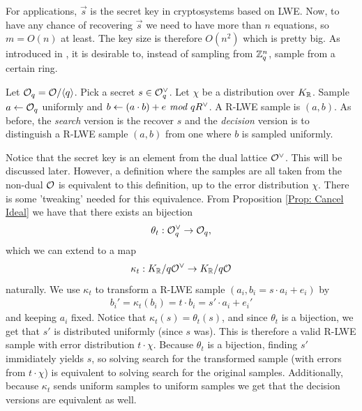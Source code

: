     For applications, \(\vec{s}\) is the secret key in cryptosystems based on LWE. Now, to have any chance of recovering \(\vec{s}\) we need to have more than \(n\) equations, so \(m = O(n)\) at least. The key size is therefore \(O(n^2)\) which is pretty big. As introduced in \cite{First R-LWE}, it is desirable to, instead of sampling from \(\mathbb{Z}_q^n\), sample from a certain ring. 
    \begin{definition}
        Let \(\mathcal{O}_q = \mathcal{O}/\langle q\rangle\). Pick a secret \(s\in \mathcal{O}_q^\vee\). Let \(\chi\) be a distribution over \(K_{\mathbb{R}}\). Sample \(a \leftarrow \mathcal{O}_q\) uniformly and \(b\leftarrow (a\cdot b) + e \emph{ mod } qR^\vee\). A R-LWE sample is \((a, b)\). As before, the \emph{search} version is the recover \(s\) and the \emph{decision} version is to distinguish a R-LWE sample \((a, b)\) from one where \(b\) is sampled uniformly.
    \end{definition}
    Notice that the secret key is an element from the dual lattice \(\mathcal{O}^\vee\). This will be discussed later. However, a definition where the samples are all taken from the non-dual \(\mathcal{O}\) is equivalent to this definition, up to the error distribution \(\chi\)\cite{How Not To RLWE}. There is some 'tweaking' needed for this equivalence. From Proposition \ref{Prop: Cancel Ideal} we have that there exists an bijection
    \begin{align*}
        \theta_t : \mathcal{O}_q^\vee\rightarrow \mathcal{O}_q,
    \end{align*}
    which we can extend to a map
    \begin{align*}
        \kappa_t:K_{\mathbb{R}}/q\mathcal{O}^\vee\rightarrow K_{\mathbb{R}}/q\mathcal{O}
    \end{align*}
    naturally. We use \(\kappa_t\) to transform a R-LWE sample \((a_i, b_i = s\cdot a_i + e_i)\) by
    \begin{align*}
        b_i' = \kappa_t(b_i) = t\cdot b_i = s'\cdot a_i + e_i'
    \end{align*}
    and keeping \(a_i\) fixed.  Notice that \(\kappa_t(s) = \theta_t(s)\), and since \(\theta_t\) is a bijection, we get that \(s'\) is distributed uniformly (since \(s\) was). This is therefore a valid R-LWE sample with error distribution \(t\cdot\chi\). Because \(\theta_t\) is a bijection, finding \(s'\) immidiately yields \(s\), so solving search for the transformed sample (with errors from \(t\cdot\chi\)) is equivalent to solving search for the original samples. Additionally, because \(\kappa_t\) sends uniform samples to uniform samples  we get that the decision versions are equivalent as well.\par
    
